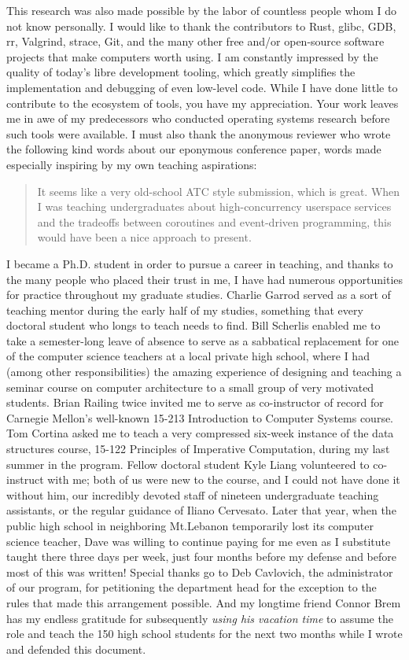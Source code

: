 This research was also made possible by the labor of countless people whom I do not
know personally.  I would like to thank the contributors to Rust, glibc, GDB, rr,
Valgrind, strace, Git, and the many other free and/or open-source software projects
that make computers worth using.  I am constantly impressed by the quality of today's
libre development tooling, which greatly simplifies the implementation and debugging
of even low-level code.  While I have done little to contribute to the ecosystem of
tools, you have my appreciation.  Your work leaves me in awe of my predecessors who
conducted operating systems research before such tools were available.  I must also
thank the anonymous reviewer who wrote the following kind words about our eponymous
conference paper, words made especially inspiring by my own teaching aspirations:
\begin{quote}
It seems like a very old-school ATC style submission, which is great.  When I was
teaching undergraduates about high-concurrency userspace services and the tradeoffs
between coroutines and event-driven programming, this would have been a nice approach
to present.
\end{quote}

I became a Ph.D. student in order to pursue a career in teaching, and thanks to the
many people who placed their trust in me, I have had numerous opportunities for
practice throughout my graduate studies.  Charlie Garrod served as a sort of teaching
mentor during the early half of my studies, something that every doctoral student who
longs to teach needs to find.  Bill Scherlis enabled me to take a semester-long leave
of absence to serve as a sabbatical replacement for one of the computer science
teachers at a local private high school, where I had (among other responsibilities)
the amazing experience of designing and teaching a seminar course on computer
architecture to a small group of very motivated students.  Brian Railing twice
invited me to serve as co-instructor of record for Carnegie Mellon's well-known
15-213 Introduction to Computer Systems course.  Tom Cortina asked me to teach a very
compressed six-week instance of the data structures course, 15-122 Principles of
Imperative Computation, during my last summer in the program.  Fellow doctoral
student Kyle Liang volunteered to co-instruct with me; both of us were new to the
course, and I could not have done it without him, our incredibly devoted staff of
nineteen undergraduate teaching assistants, or the regular guidance of Iliano
Cervesato.  Later that year, when the public high school in neighboring Mt.\@ Lebanon
temporarily lost its computer science teacher, Dave was willing to continue paying
for me even as I substitute taught there three days per week, just four months before
my defense and before most of this \thesis was written!  Special thanks go to Deb
Cavlovich, the administrator of our program, for petitioning the department head for
the exception to the rules that made this arrangement possible.  And my longtime
friend Connor Brem has my endless gratitude for subsequently \textit{using his
vacation time} to assume the role and teach the 150 high school students for the next
two months while I wrote and defended this document.

